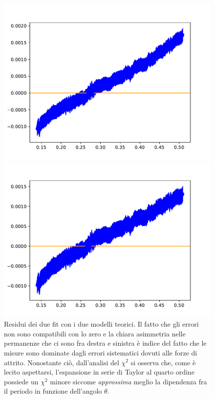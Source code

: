 \documentclass{article}
\begin{document}
\begin{figure}[H]
\begin{minipage}{0.49\textwidth}
	\centering
	\includegraphics[scale=0.60]{Residui_taylor_2.pdf}
\end{minipage}
\begin{minipage}{0.49\textwidth}
	\centering
	\includegraphics[scale=0.60]{Residui_taylor_4.pdf}
\end{minipage}	
	\caption{Residui dei due fit con i due modelli teorici. Il fatto che gli errori non sono compatibili con lo zero e la chiara asimmetria nelle permanenze che ci sono fra destra e sinistra è indice del fatto che le misure sono dominate dagli errori sistematici dovuti alle forze di attrito. Nonostante ciò, dall'analisi del $\chi^2$ si osserva che, come è lecito aspettarsi, l'espansione in serie di Taylor al quarto ordine possiede un $\chi^2$ minore siccome \emph{approssima} meglio la dipendenza fra il periodo in funzione dell'angolo $\theta$.}
\end{figure}
\end{document}
